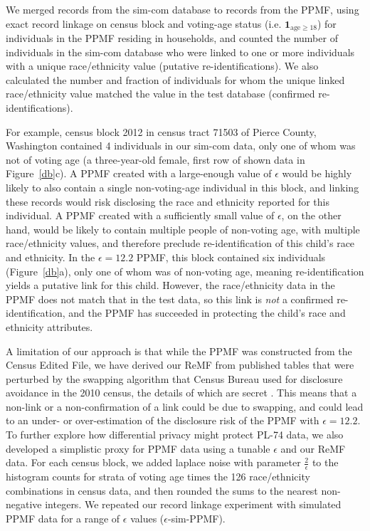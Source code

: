 \documentclass{article}
\begin{document}
We merged records from the sim-com database to records from the PPMF, using exact record linkage on census block and voting-age status (i.e. $\mathbf{1}_{\mathrm{age} \geq 18}$) for individuals in the PPMF residing in households, and counted the number of individuals in the sim-com database who were linked to one or more individuals with a unique race/ethnicity value (putative re-identifications).  We also calculated the number and fraction of individuals for whom the unique linked race/ethnicity value matched the value in the test database (confirmed re-identifications).

For example, census block 2012 in census tract 71503 of Pierce County, Washington contained 4 individuals in our sim-com data, only one of whom was not of voting age (a three-year-old female, first row of shown data in Figure~\ref{db}c).  A PPMF created with a large-enough value of $\epsilon$ would be highly likely to also contain a single non-voting-age individual in this block, and linking these records would risk disclosing the race and ethnicity reported for this individual. A PPMF created with a sufficiently small value of $\epsilon$, on the other hand, would be likely to contain multiple people of non-voting age, with multiple race/ethnicity values, and therefore preclude re-identification of this child's race and ethnicity. In the $\epsilon=12.2$ PPMF, this block contained six individuals (Figure~\ref{db}a), only one of whom was of non-voting age, meaning re-identification yields a putative link for this child. However, the race/ethnicity data in the PPMF does not match that in the test data, so this link is \emph{not} a confirmed re-identification, and the PPMF has succeeded in protecting the child's race and ethnicity attributes.

A limitation of our approach is that while the PPMF was constructed from the Census Edited File, we have derived our ReMF from published tables that were perturbed by the swapping algorithm that Census Bureau used for disclosure avoidance in the 2010 census, the details of which are secret \cite{mckenna2018disclosure}.   This means that a non-link or a non-confirmation of a link could be due to swapping, and could lead to an under- or over-estimation of the disclosure risk of the PPMF with $\epsilon=12.2$.  To further explore how differential privacy might protect PL-74 data, we also developed a simplistic proxy for PPMF data using a tunable $\epsilon$ and our ReMF data.  For each census block, we added laplace noise with parameter $\frac{2}{\epsilon}$ to the histogram counts for strata of voting age times the 126 race/ethnicity combinations in census data, and then rounded the sums to the nearest non-negative integers.  We repeated our record linkage experiment with simulated PPMF data for a range of $\epsilon$ values ($\epsilon$-sim-PPMF).
\end{document}
